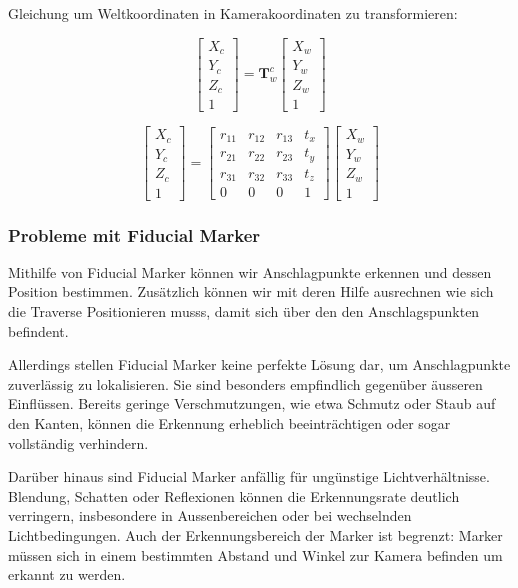 Gleichung um Weltkoordinaten in Kamerakoordinaten zu transformieren:

\[
\begin{bmatrix}
X_c \\ 
Y_c \\ 
Z_c \\ 
1
\end{bmatrix}
=
\mathbf{T}^c_{w}
\begin{bmatrix}
X_w \\ 
Y_w \\ 
Z_w \\ 
1
\end{bmatrix}
\]

\[
\begin{bmatrix}
X_c \\ 
Y_c \\ 
Z_c \\ 
1
\end{bmatrix}
=
\begin{bmatrix}
r_{11} & r_{12} & r_{13} & t_x \\
r_{21} & r_{22} & r_{23} & t_y \\
r_{31} & r_{32} & r_{33} & t_z \\
0 & 0 & 0 & 1
\end{bmatrix}
\begin{bmatrix}
X_w \\ 
Y_w \\ 
Z_w \\ 
1
\end{bmatrix}
\]

\subsubsection{Probleme mit Fiducial Marker}
Mithilfe von Fiducial Marker können wir Anschlagpunkte erkennen und dessen Position bestimmen.
Zusätzlich können wir mit deren Hilfe ausrechnen wie sich die Traverse Positionieren musss, damit
sich über den den Anschlagspunkten befindent.

Allerdings stellen Fiducial Marker  keine perfekte Lösung dar, um Anschlagpunkte zuverlässig zu lokalisieren. 
Sie sind besonders empfindlich gegenüber äusseren Einflüssen. Bereits geringe Verschmutzungen, 
wie etwa Schmutz oder Staub auf den Kanten, können die Erkennung erheblich beeinträchtigen 
oder sogar vollständig verhindern.

Darüber hinaus sind Fiducial Marker anfällig für ungünstige Lichtverhältnisse. Blendung, Schatten 
oder Reflexionen können die Erkennungsrate deutlich verringern, insbesondere in Aussenbereichen 
oder bei wechselnden Lichtbedingungen. Auch der Erkennungsbereich der Marker ist begrenzt: Marker 
müssen sich in einem bestimmten Abstand und Winkel zur Kamera befinden um erkannt zu werden.

